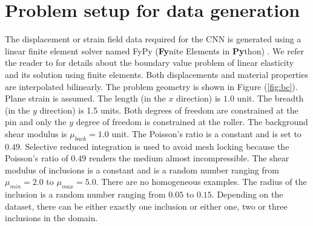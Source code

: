 \documentclass[12pt]{article}
\begin{document}
\section{\label{sect:probsetup}Problem setup for data generation}
The displacement or strain field data required for the CNN is generated using a linear finite element solver named FyPy (\textbf{Fy}nite Elements in \textbf{Py}thon) \cite{misc:fypy}. We refer the reader to \cite{book:hugheslinear,book:fishbelytschko,book:segelmathcont} for details about the boundary value problem of linear elasticity and its solution using finite elements. Both displacements and material properties are interpolated bilinearly. The problem geometry is shown in Figure (\ref{fig:bc}). Plane strain is assumed. The length (in the $x$ direction) is $1.0$ unit. The breadth (in the $y$ direction) is 1.5 units. Both degrees of freedom are constrained at the pin and only the $y$ degree of freedom is constrained at the roller. The background shear modulus is $\mu_{back}=1.0$ unit. The Poisson's ratio is a constant and is set to $0.49$. Selective reduced integration is used to avoid mesh locking because the Poisson's ratio of $0.49$ renders the medium almost incompressible. The shear modulus of inclusions is a constant and is a random number ranging from $\mu_{min}=2.0$ to $\mu_{max}=5.0$. There are no homogeneous examples. The radius of the inclusion is a random number ranging from $0.05$ to $0.15$. Depending on the dataset, there can be either exactly one inclusion or either one, two or three inclusions in the domain. 
\end{document}
